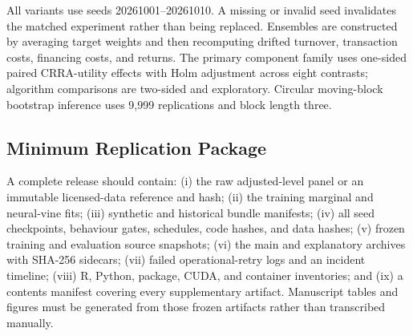 All variants use seeds 20261001--20261010. A missing or invalid seed invalidates the matched experiment rather than being replaced. Ensembles are constructed by averaging target weights and then recomputing drifted turnover, transaction costs, financing costs, and returns. The primary component family uses one-sided paired CRRA-utility effects with Holm adjustment across eight contrasts; algorithm comparisons are two-sided and exploratory. Circular moving-block bootstrap inference uses 9,999 replications and block length three.

\subsection{Minimum Replication Package}

A complete release should contain: (i) the raw adjusted-level panel or an immutable licensed-data reference and hash; (ii) the training marginal and neural-vine fits; (iii) synthetic and historical bundle manifests; (iv) all seed checkpoints, behaviour gates, schedules, code hashes, and data hashes; (v) frozen training and evaluation source snapshots; (vi) the main and explanatory archives with SHA-256 sidecars; (vii) failed operational-retry logs and an incident timeline; (viii) R, Python, package, CUDA, and container inventories; and (ix) a contents manifest covering every supplementary artifact. Manuscript tables and figures must be generated from those frozen artifacts rather than transcribed manually.
